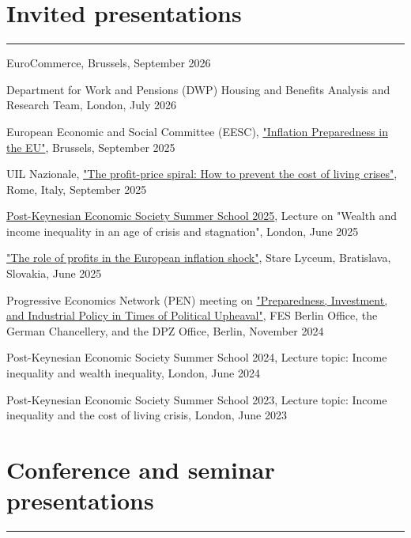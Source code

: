 \documentclass[letterpaper]{article}
\renewenvironment{itemize}{
  \begin{list}{}
    { \setlength{\itemsep}{5pt}
      \setlength{\parsep}{0pt}
      \setlength{\topsep}{0pt}
      \setlength{\leftmargin}{0em} } }{
  \end{list}}
\begin{document}
\section*{Invited presentations}
\hrule
\vspace{2mm}
\begin{itemize}
    \item EuroCommerce, Brussels, September 2026 
    \item Department for Work and Pensions (DWP) Housing and Benefits Analysis and Research Team, London, July 2026
    \item European Economic and Social Committee (EESC), \href{https://feps-europe.eu/event/inflation-preparedness-in-the-eu/}{"Inflation Preparedness in the EU"}, Brussels, September 2025
    \item UIL Nazionale, \href{https://feps-europe.eu/event/the-profit-price-spiral-how-to-prevent-the-cost-of-living-crises/}{"The profit-price spiral: How to prevent the cost of living crises"}, Rome, Italy, September 2025
    \item \href{https://www.postkeynesian.net/event/2025-pkes-summer-school/}{Post-Keynesian Economic Society Summer School 2025}, Lecture on "Wealth and income inequality in an age of crisis and stagnation", London, June 2025
    \item \href{https://feps-europe.eu/event/the-role-of-profits-in-the-european-inflation-shock-the-case-of-slovakia/}{"The role of profits in the European inflation shock"}, Stare Lyceum, Bratislava, Slovakia, June 2025
    \item Progressive Economics Network (PEN) meeting on \href{https://www.progressives-zentrum.org/en/preparedness-investment-and-industrial-policy-in-times-of-political-upheaval-progressive-economics-network-meeting-in-berlin/}{"Preparedness, Investment, and Industrial Policy in Times of Political Upheaval"}, FES Berlin Office, the German Chancellery, and the DPZ Office, Berlin, November 2024
    \item Post-Keynesian Economic Society Summer School 2024, Lecture topic: Income inequality and wealth inequality, London, June 2024
    \item Post-Keynesian Economic Society Summer School 2023, Lecture topic: Income inequality and the cost of living crisis, London, June 2023
\end{itemize} 

\section*{Conference and seminar presentations}
\hrule
\vspace{2mm}
\end{document}
